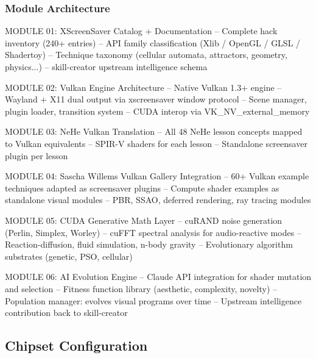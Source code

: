 \documentclass[11pt,letterpaper]{article}
\begin{document}
\subsubsection{Module Architecture}

\begin{asciibox}
MODULE 01: XScreenSaver Catalog + Documentation
  -- Complete hack inventory (240+ entries)
  -- API family classification (Xlib / OpenGL / GLSL / Shadertoy)
  -- Technique taxonomy (cellular automata, attractors, geometry, physics...)
  -- skill-creator upstream intelligence schema

MODULE 02: Vulkan Engine Architecture
  -- Native Vulkan 1.3+ engine
  -- Wayland + X11 dual output via xscreensaver window protocol
  -- Scene manager, plugin loader, transition system
  -- CUDA interop via VK_NV_external_memory

MODULE 03: NeHe Vulkan Translation
  -- All 48 NeHe lesson concepts mapped to Vulkan equivalents
  -- SPIR-V shaders for each lesson
  -- Standalone screensaver plugin per lesson

MODULE 04: Sascha Willems Vulkan Gallery Integration
  -- 60+ Vulkan example techniques adapted as screensaver plugins
  -- Compute shader examples as standalone visual modules
  -- PBR, SSAO, deferred rendering, ray tracing modules

MODULE 05: CUDA Generative Math Layer
  -- cuRAND noise generation (Perlin, Simplex, Worley)
  -- cuFFT spectral analysis for audio-reactive modes
  -- Reaction-diffusion, fluid simulation, n-body gravity
  -- Evolutionary algorithm substrates (genetic, PSO, cellular)

MODULE 06: AI Evolution Engine
  -- Claude API integration for shader mutation and selection
  -- Fitness function library (aesthetic, complexity, novelty)
  -- Population manager: evolves visual programs over time
  -- Upstream intelligence contribution back to skill-creator
\end{asciibox}

\subsection{Chipset Configuration}
\end{document}
